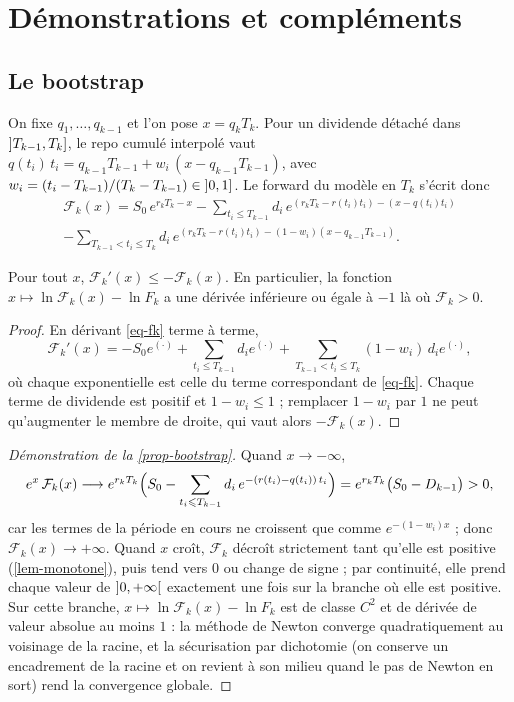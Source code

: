\section{Démonstrations et compléments}\label{app-proofs}

\subsection{Le bootstrap}\label{app-bootstrap}
On fixe $q_1, \dots, q_{k-1}$ et l'on pose $x=q_kT_k$. Pour un dividende détaché dans $\intoc{T_{k-1}}{T_k}$, le repo
cumulé interpolé vaut $q(t_i)\,t_i=q_{k-1}T_{k-1}+w_i\,(x-q_{k-1}T_{k-1})$, avec
$w_i=(t_i-T_{k-1})/(T_k-T_{k-1})\in\intoc{0}{1}$. Le forward du modèle en $T_k$ s'écrit donc
\begin{multline}\label{eq-fk}
\mathcal F_k(x)=S_0\,e^{r_kT_k-x}-\sum_{t_i\le T_{k-1}}d_i\,e^{(r_kT_k-r(t_i)t_i)-(x-q(t_i)t_i)}\\
-\sum_{T_{k-1}<t_i\le T_k}d_i\,e^{(r_kT_k-r(t_i)t_i)-(1-w_i)(x-q_{k-1}T_{k-1})} .
\end{multline}

\begin{lemma}[Monotonie]\label{lem-monotone}
Pour tout $x$, $\mathcal F_k'(x)\le-\mathcal F_k(x)$. En particulier, la fonction $x\mapsto\ln\mathcal F_k(x)-\ln F_k$
a une dérivée inférieure ou égale à $-1$ là où $\mathcal F_k>0$.
\end{lemma}
\begin{proof}
En dérivant \eqref{eq-fk} terme à terme,
\[
\mathcal F_k'(x)=-S_0e^{(\cdot)}+\sum_{t_i\le T_{k-1}}d_ie^{(\cdot)}+\sum_{T_{k-1}<t_i\le T_k}(1-w_i)\,d_ie^{(\cdot)},
\]
où chaque exponentielle est celle du terme correspondant de \eqref{eq-fk}. Chaque terme de dividende est positif et $1-w_i\le1$ ; remplacer $1-w_i$ par $1$ ne peut qu'augmenter le membre de
droite, qui vaut alors $-\mathcal F_k(x)$.
\end{proof}

\begin{proof}[Démonstration de la \cref{prop-bootstrap}]
Quand $x\to-\infty$,
\[
e^{x}\,\mathcal F_k(x)\longrightarrow e^{r_kT_k}\Bigl(S_0-\sum_{t_i\le T_{k-1}}d_i\,e^{-(r(t_i)-q(t_i))\,t_i}\Bigr)
=e^{r_kT_k}\bigl(S_0-D_{k-1}\bigr)>0,
\]
car les termes de la période en cours ne croissent que comme $e^{-(1-w_i)x}$ ; donc $\mathcal F_k(x)\to+\infty$. Quand
$x$ croît, $\mathcal F_k$ décroît strictement tant qu'elle est positive (\cref{lem-monotone}), puis tend vers $0$ ou
change de signe ; par continuité, elle prend chaque valeur de $\intoo{0}{+\infty}$ exactement une fois sur la branche
où elle est positive. Sur cette branche, $x\mapsto\ln\mathcal F_k(x)-\ln F_k$ est de classe $C^2$ et de dérivée de
valeur absolue au moins $1$ : la méthode de Newton converge quadratiquement au voisinage de la racine, et la
sécurisation par dichotomie (on conserve un encadrement de la racine et on revient à son milieu quand le pas de Newton
en sort) rend la convergence globale.
\end{proof}

